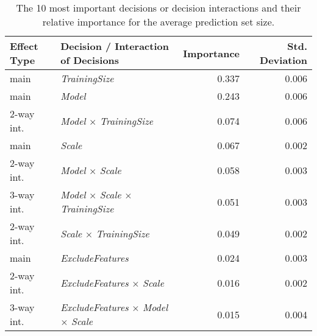 \begin{table}
\centering
\caption{The 10 most important decisions or decision interactions and their relative importance for the average prediction set size.}
\label{tab:fanova_top10}
\begin{tabular}{llrr}
\toprule
Effect Type &                                      Decision / Interaction of Decisions &  Importance &  Std. Deviation \\
\midrule
       main &                                                    \textit{TrainingSize} &       0.337 &           0.006 \\
       main &                                                           \textit{Model} &       0.243 &           0.006 \\
 2-way int. &                            \textit{Model} $\times$ \textit{TrainingSize} &       0.074 &           0.006 \\
       main &                                                           \textit{Scale} &       0.067 &           0.002 \\
 2-way int. &                                   \textit{Model} $\times$ \textit{Scale} &       0.058 &           0.003 \\
 3-way int. &    \textit{Model} $\times$ \textit{Scale} $\times$ \textit{TrainingSize} &       0.051 &           0.003 \\
 2-way int. &                            \textit{Scale} $\times$ \textit{TrainingSize} &       0.049 &           0.002 \\
       main &                                                 \textit{ExcludeFeatures} &       0.024 &           0.003 \\
 2-way int. &                         \textit{ExcludeFeatures} $\times$ \textit{Scale} &       0.016 &           0.002 \\
 3-way int. & \textit{ExcludeFeatures} $\times$ \textit{Model} $\times$ \textit{Scale} &       0.015 &           0.004 \\
\bottomrule
\end{tabular}
\end{table}
